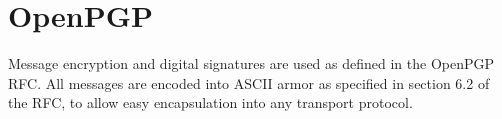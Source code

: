 \section{OpenPGP}
\label{openpgp}
Message encryption and digital signatures are
used as defined in the OpenPGP RFC.\cite{rfc2440}
All messages are encoded into ASCII armor
as specified in section 6.2 of the RFC, to allow easy
encapsulation into any transport protocol.

